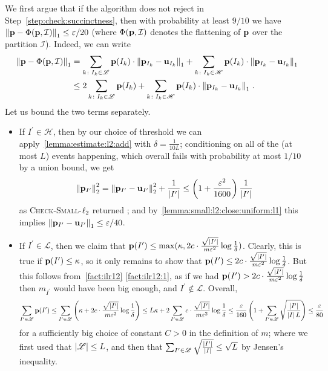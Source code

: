 We first argue that if the algorithm does not reject in Step~\ref{step:check:succinctness}, then with probability at least $9/10$ we have $\normone{\D-\Phi(\D,\mathcal{I})} \leq \eps/20$ (where $\Phi(\D,\mathcal{I})$ denotes the flattening of $\D$ over the partition $\mathcal{I}$). Indeed, we can write
\begin{align*}
  \normone{\D-\Phi(\D,\mathcal{I})} &= 
            \sum_{k\colon I_k \in \mathscr{L} } \D(I_k)\cdot \normone{\D_{I_k} - \uniform_{I_k}} 
          + \sum_{k\colon I_k \in \mathscr{H}} \D(I_k)\cdot \normone{\D_{I_k} - \uniform_{I_k}} \\
          &\leq 2\sum_{k\colon I_k \in \mathscr{L} } \D(I_k) + \sum_{k\colon I_k \in \mathscr{H} } \D(I_k)\cdot \normone{\D_{I_k} - \uniform_{I_k}}\;.
\end{align*}
Let us bound the two terms separately.
    \begin{itemize}
      \item If $I^\prime \in \mathscr{H}$, then by our choice of threshold we can apply~\cref{lemma:estimate:l2:add} with $\delta=\frac{1}{10L}$; conditioning on all of the (at most $L$) events happening, which overall fails with probability at most $1/10$ by a union bound, we get
        \[
            \normtwo{\D_{I^\prime}}^2 = \normtwo{\D_{I^\prime}-\uniform_{I^\prime}}^2 + \frac{1}{\abs{I^\prime}} 
            \leq \left( 1+\frac{\eps^2}{1600} \right) \frac{1}{\abs{I^\prime}}
        \]
        as \textsc{Check-Small-$\lp[2]$} returned \yes; and by~\cref{lemma:small:l2:close:uniform:l1} this implies $\normone{\D_{I^\prime} - \uniform_{I^\prime}}\leq \eps/40$.
      \item 
      If $I^\prime \in \mathscr{L}$, then we claim that 
      $\D(I^\prime) \leq \max( \kappa, 2c\cdot\frac{\sqrt{\abs{I^\prime}}}{m\eps^2}\log\frac{1}{\delta} )$. Clearly, this is true if $\D(I^\prime) \leq \kappa$, so it only remains to show that $\D(I^\prime) \leq 2c\cdot\frac{\sqrt{\abs{I^\prime}}}{m\eps^2}\log\frac{1}{\delta}$. But this follows from~\cref{fact:ilr12} \ref{fact:ilr12:1}, as if we had 
$\D(I^\prime) > 2c\cdot\frac{\sqrt{\abs{I^\prime}}}{m\eps^2}\log\frac{1}{\delta}$ then $m_{I^\prime}$ would have been big enough, and $I^\prime\notin \mathscr{L}$. Overall,
\[
\sum_{I^\prime \in \mathscr{L} } \D(I^\prime) 
\leq \sum_{I^\prime \in \mathscr{L} } \left( \kappa + 2c\cdot\frac{\sqrt{\abs{I^\prime}}}{m\eps^2}\log\frac{1}{\delta} \right)
\leq L\kappa + 2\sum_{I^\prime \in \mathscr{L} } c\cdot\frac{\sqrt{\abs{I^\prime}}}{m\eps^2}\log\frac{1}{\delta}
\leq \frac{\eps}{160}\left(1+ \sum_{I^\prime \in \mathscr{L} } \sqrt{\frac{\abs{I^\prime}}{\abs{I}L}}\right)
\leq \frac{\eps}{80}
\]
for a sufficiently big choice of constant $C>0$ in the definition of $m$; where we first used that $\abs{\mathscr{L}} \leq L$, and then that $\sum_{I^\prime \in \mathscr{L} } \sqrt{\frac{\abs{I^\prime}}{\abs{I}}}\leq \sqrt{L}$ by Jensen's inequality.

    \end{itemize}
